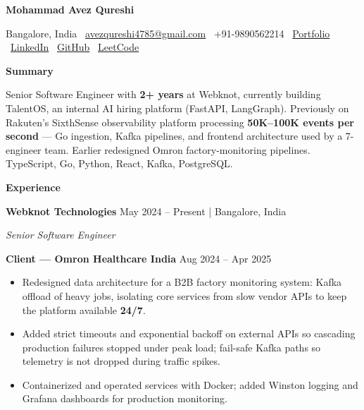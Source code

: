 \documentclass[10pt]{article}
\newcommand{\sectiontitle}[1]{%
  \par\vspace{8pt}%
  \noindent\textbf{\large #1}\par
  \vspace{-2pt}\noindent\hrulefill\par
  \vspace{4pt}%
}
\newcommand{\role}[3]{%
  \noindent\textbf{#1} \hfill #3\par
  \textit{#2}\par
  \vspace{3pt}%
}
\newcommand{\client}[2]{%
  \par\vspace{8pt}%
  \noindent\textbf{Client --- #1} \hfill #2\par
  \vspace{3pt}%
}
\begin{document}
\vspace*{-8pt}
{\centering
  {\LARGE\textbf{Mohammad Avez Qureshi}}\par
  \vspace{3pt}
  {\small Bangalore, India \textbar\
  \href{mailto:avezqureshi4785@gmail.com}{avezqureshi4785@gmail.com} \textbar\
  +91-9890562214 \textbar\
  \href{https://avezqureshi.vercel.app/}{Portfolio} \textbar\
  \href{https://www.linkedin.com/in/avezqureshi14/}{LinkedIn} \textbar\
  \href{https://github.com/avezqureshi14}{GitHub} \textbar\
  \href{https://leetcode.com/avezqureshi14/}{LeetCode}}\par
}

\sectiontitle{Summary}

Senior Software Engineer with \textbf{2+ years} at Webknot, currently building TalentOS, an internal AI hiring platform (FastAPI, LangGraph). Previously on Rakuten's SixthSense observability platform processing \textbf{50K--100K events per second} --- Go ingestion, Kafka pipelines, and frontend architecture used by a 7-engineer team. Earlier redesigned Omron factory-monitoring pipelines. TypeScript, Go, Python, React, Kafka, PostgreSQL.

\sectiontitle{Experience}

\role{Webknot Technologies}{Senior Software Engineer}{May 2024 -- Present | Bangalore, India}

\client{Omron Healthcare India}{Aug 2024 -- Apr 2025}
\begin{itemize}
  \item Redesigned data architecture for a B2B factory monitoring system: Kafka offload of heavy jobs, isolating core services from slow vendor APIs to keep the platform available \textbf{24/7}.
  \item Added strict timeouts and exponential backoff on external APIs so cascading production failures stopped under peak load; fail-safe Kafka paths so telemetry is not dropped during traffic spikes.
  \item Containerized and operated services with Docker; added Winston logging and Grafana dashboards for production monitoring.
\end{itemize}
\end{document}

